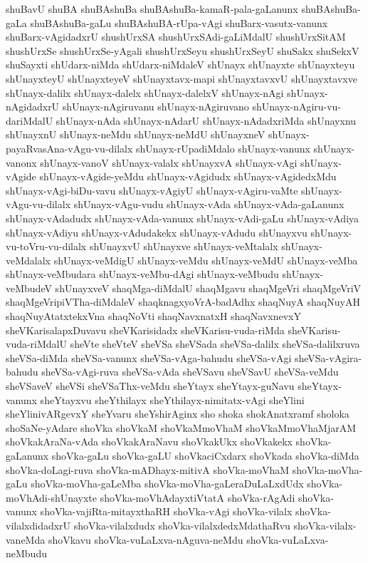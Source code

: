 {shuBavU
shuBA
shuBAshuBa
shuBAshuBa-kamaR-pala-gaLanunx
shuBAshuBa-gaLa
shuBAshuBa-gaLu
shuBAshuBA-rUpa-vAgi
shuBarx-vasutx-vanunx
shuBarx-vAgidadxrU
shushUrxSA
shushUrxSAdi-gaLiMdalU
shushUrxSitAM
shushUrxSe
shushUrxSe-yAgali
shushUrxSeyu
shushUrxSeyU
shuSakx
shuSekxV
shuSayxti
shUdarx-niMda
shUdarx-niMdaleV
shUnayx
shUnayxte
shUnayxteyu
shUnayxteyU
shUnayxteyeV
shUnayxtavx-mapi
shUnayxtavxvU
shUnayxtavxve
shUnayx-dalilx
shUnayx-dalelx
shUnayx-dalelxV
shUnayx-nAgi
shUnayx-nAgidadxrU
shUnayx-nAgiruvanu
shUnayx-nAgiruvano
shUnayx-nAgiru-vu-dariMdalU
shUnayx-nAda
shUnayx-nAdarU
shUnayx-nAdadxriMda
shUnayxnu
shUnayxnU
shUnayx-neMdu
shUnayx-neMdU
shUnayxneV
shUnayx-payaRvasAna-vAgu-vu-dilalx
shUnayx-rUpadiMdalo
shUnayx-vanunx
shUnayx-vanonx
shUnayx-vanoV
shUnayx-valalx
shUnayxvA
shUnayx-vAgi
shUnayx-vAgide
shUnayx-vAgide-yeMdu
shUnayx-vAgidudx
shUnayx-vAgidedxMdu
shUnayx-vAgi-biDu-vavu
shUnayx-vAgiyU
shUnayx-vAgiru-vaMte
shUnayx-vAgu-vu-dilalx
shUnayx-vAgu-vudu
shUnayx-vAda
shUnayx-vAda-gaLanunx
shUnayx-vAdadudx
shUnayx-vAda-vanunx
shUnayx-vAdi-gaLu
shUnayx-vAdiya
shUnayx-vAdiyu
shUnayx-vAdudakekx
shUnayx-vAdudu
shUnayxvu
shUnayx-vu-toVru-vu-dilalx
shUnayxvU
shUnayxve
shUnayx-veMtalalx
shUnayx-veMdalalx
shUnayx-veMdigU
shUnayx-veMdu
shUnayx-veMdU
shUnayx-veMba
shUnayx-veMbudara
shUnayx-veMbu-dAgi
shUnayx-veMbudu
shUnayx-veMbudeV
shUnayxveV
shaqMga-diMdalU
shaqMgavu
shaqMgeVri
shaqMgeVriV
shaqMgeVripiVTha-diMdaleV
shaqknagxyoVrA-badAdhx
shaqNuyA
shaqNuyAH
shaqNuyAtatxtekxVna
shaqNoVti
shaqNavxnatxH
shaqNavxnevxY
sheVKarisalapxDuvavu
sheVKarisidadx
sheVKarisu-vuda-riMda
sheVKarisu-vuda-riMdalU
sheVte
sheVteV
sheVSa
sheVSada
sheVSa-dalilx
sheVSa-dalilxruva
sheVSa-diMda
sheVSa-vanunx
sheVSa-vAga-bahudu
sheVSa-vAgi
sheVSa-vAgira-bahudu
sheVSa-vAgi-ruva
sheVSa-vAda
sheVSavu
sheVSavU
sheVSa-veMdu
sheVSaveV
sheVSi
sheVSaThx-veMdu
sheYtayx
sheYtayx-guNavu
sheYtayx-vanunx
sheYtayxvu
sheYthilayx
sheYthilayx-nimitatx-vAgi
sheYlini
sheYlinivARgevxY
sheYvaru
sheYshirAginx
sho
shoka
shokAnatxramf
sholoka
shoSaNe-yAdare
shoVka
shoVkaM
shoVkaMmoVhaM
shoVkaMmoVhaMjarAM
shoVkakAraNa-vAda
shoVkakAraNavu
shoVkakUkx
shoVkakekx
shoVka-gaLanunx
shoVka-gaLu
shoVka-gaLU
shoVkaciCxdarx
shoVkada
shoVka-diMda
shoVka-doLagi-ruva
shoVka-mADhayx-mitivA
shoVka-moVhaM
shoVka-moVha-gaLu
shoVka-moVha-gaLeMba
shoVka-moVha-gaLeraDuLaLxdUdx
shoVka-moVhAdi-shUnayxte
shoVka-moVhAdayxtiVtatA
shoVka-rAgAdi
shoVka-vanunx
shoVka-vajiRta-mitayxthaRH
shoVka-vAgi
shoVka-vilalx
shoVka-vilalxdidadxrU
shoVka-vilalxdudx
shoVka-vilalxdedxMdathaRvu
shoVka-vilalx-vaneMda
shoVkavu
shoVka-vuLaLxva-nAguva-neMdu
shoVka-vuLaLxva-neMbudu
}
